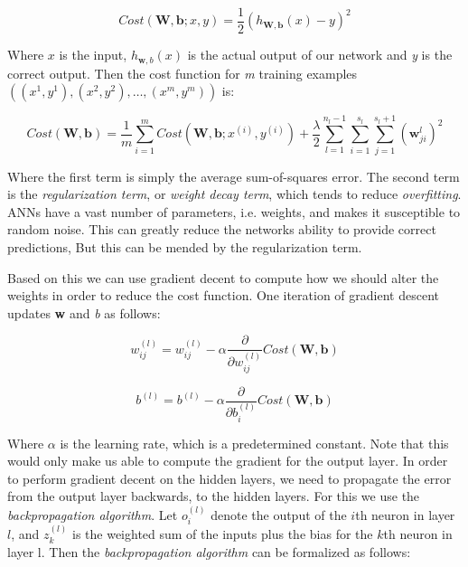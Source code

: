 \begin{equation}
	Cost(\mathbf{W},\mathbf{b}; x, y) = \frac{1}{2}(h_{\mathbf{W},\mathbf{b}}(x) - y)^2
\end{equation}

Where $ x $ is the input, $ h_{\mathbf{w},b}(x) $ is the actual output of our network and \textit{y} is the correct output.
Then the cost function for \textit{m} training examples $ ((x^{1}, y^{1}), (x^{2}, y^{2}), \dots, (x^{m}, y^{m})) $ is:

\begin{equation}
	Cost(\mathbf{W},\mathbf{b}) = \frac{1}{m}\sum_{i=1}^{m}Cost(\mathbf{W},\mathbf{b};x^{(i)},y^{(i)}) + \frac{\lambda}{2}
	\sum_{l=1}^{n_l-1}\sum_{i=1}^{s_l}\sum_{j=1}^{s_l+1}
	(\mathbf{w}_{ji}^{l})^2
\end{equation}
 
Where the first term is simply the average sum-of-squares error. The second term is the \textit{regularization term}, or \textit{weight decay term}, which tends to reduce \textit{overfitting}. ANNs have a vast number of parameters, i.e. weights, and makes it susceptible to random noise. This can greatly reduce the networks ability to provide correct predictions, But this  can be mended by the regularization term. 

Based on this we can use gradient decent to compute how we should alter the weights in order to reduce the cost function. One iteration of gradient descent updates \textbf{w} and \textit{b} as follows:

\begin{equation}
	w_{ij}^{(l)} = w_{ij}^{(l)} - \alpha\frac{\partial}{\partial w_{ij}^{(l)} }Cost(\mathbf{W},\mathbf{b})
\end{equation}

\begin{equation}
	b^{(l)} = b^{(l)} - \alpha\frac{\partial}{\partial b_{i}^{(l)} }Cost(\mathbf{W},\mathbf{b})
\end{equation}

Where $ \alpha $ is the learning rate, which is a predetermined constant. Note that this would only make us able to compute the gradient for the output layer. In order to perform gradient decent on the hidden layers, we need to propagate the error from the output layer backwards, to the hidden layers. For this we use the \textit{backpropagation algorithm}. Let $ o_i^{(l)} $ denote the output of the $i$th neuron in layer $l$, and $z_k^{(l)}$ is the weighted sum of the inputs plus the bias for the $k$th neuron in layer l. Then the \textit{backpropagation algorithm} can be formalized as follows: 

